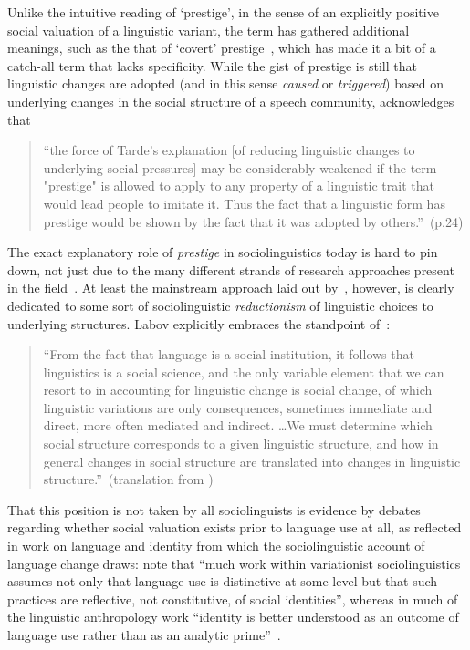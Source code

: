 Unlike the intuitive reading of `prestige', in the sense of an explicitly positive social valuation of a linguistic variant, the term has gathered additional meanings, such as the that of `covert' prestige~\citep{Trudgill1972}, which has made it a bit of a catch-all term that lacks specificity.
While the gist of prestige is still that linguistic changes are adopted (and in this sense \emph{caused} or \emph{triggered}) based on underlying changes in the social structure of a speech community, \citet{Labov2001} acknowledges that

\begin{quote}
``the force of Tarde's explanation [of reducing linguistic changes to underlying social pressures] may be considerably weakened if the term "prestige" is allowed to apply to any property of a linguistic trait that would lead people to imitate it. Thus the fact that a linguistic form has prestige would be shown by the fact that it was adopted by others.''~(p.24)
\end{quote}

The exact explanatory role of \emph{prestige} in sociolinguistics today is hard to pin down, not just due to the many different strands of research approaches present in the field~\citep{Tagliamonte2015}. At least the mainstream approach laid out by~\citet{Labov2001}, however, is clearly dedicated to some sort of sociolinguistic \emph{reductionism} of linguistic choices to underlying structures. Labov explicitly embraces the standpoint of~\citet{Meillet1926}:


\begin{quote}
``From the fact that language is a social institution, it follows that linguistics is a social science, and the only variable element that we can resort to in accounting for linguistic change is social change, of which linguistic variations are only consequences, sometimes immediate and direct, more often mediated and indirect. \ldots We must determine which social structure corresponds to a given linguistic structure, and how in general changes in social structure are translated into changes in linguistic structure.''~(translation from \citealt[p.22-23]{Labov2001})
\end{quote}

That this position is not taken by all sociolinguists is evidence by debates regarding whether social valuation exists prior to language use at all, as reflected in work on language and identity from which the sociolinguistic account of language change draws: \citeauthor{Bucholtz2004} note that ``much work within variationist sociolinguistics assumes not only that language use is distinctive at some level but that such practices are reflective, not constitutive, of social identities'', whereas in much of the linguistic anthropology work ``identity is better understood as an outcome of language use rather than as an analytic prime''~\citep[p.376]{Bucholtz2004}.


